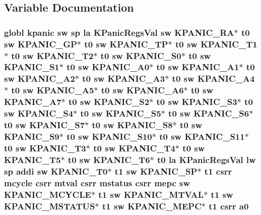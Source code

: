 \subsection{Variable Documentation}
\hypertarget{riscv_2kpanica_8S_ad4f8b71682971ae1fc71e9675e0a11df}{
\subsubsection[{a0}]{\setlength{\rightskip}{0pt plus 5cm}globl {\bf kpanic} {\bf sw} {\bf sp} {\bf la} {\bf K\-Panic\-Regs\-Val} {\bf sw} {\bf K\-P\-A\-N\-I\-C\-\_\-\-R\-A}$\ast$ {\bf t0} {\bf sw} {\bf K\-P\-A\-N\-I\-C\-\_\-\-G\-P}$\ast$ {\bf t0} {\bf sw} {\bf K\-P\-A\-N\-I\-C\-\_\-\-T\-P}$\ast$ {\bf t0} {\bf sw} {\bf K\-P\-A\-N\-I\-C\-\_\-\-T1}$\ast$ {\bf t0} {\bf sw} {\bf K\-P\-A\-N\-I\-C\-\_\-\-T2}$\ast$ {\bf t0} {\bf sw} {\bf K\-P\-A\-N\-I\-C\-\_\-\-S0}$\ast$ {\bf t0} {\bf sw} {\bf K\-P\-A\-N\-I\-C\-\_\-\-S1}$\ast$ {\bf t0} {\bf sw} {\bf K\-P\-A\-N\-I\-C\-\_\-\-A0}$\ast$ {\bf t0} {\bf sw} {\bf K\-P\-A\-N\-I\-C\-\_\-\-A1}$\ast$ {\bf t0} {\bf sw} {\bf K\-P\-A\-N\-I\-C\-\_\-\-A2}$\ast$ {\bf t0} {\bf sw} {\bf K\-P\-A\-N\-I\-C\-\_\-\-A3}$\ast$ {\bf t0} {\bf sw} {\bf K\-P\-A\-N\-I\-C\-\_\-\-A4}$\ast$ {\bf t0} {\bf sw} {\bf K\-P\-A\-N\-I\-C\-\_\-\-A5}$\ast$ {\bf t0} {\bf sw} {\bf K\-P\-A\-N\-I\-C\-\_\-\-A6}$\ast$ {\bf t0} {\bf sw} {\bf K\-P\-A\-N\-I\-C\-\_\-\-A7}$\ast$ {\bf t0} {\bf sw} {\bf K\-P\-A\-N\-I\-C\-\_\-\-S2}$\ast$ {\bf t0} {\bf sw} {\bf K\-P\-A\-N\-I\-C\-\_\-\-S3}$\ast$ {\bf t0} {\bf sw} {\bf K\-P\-A\-N\-I\-C\-\_\-\-S4}$\ast$ {\bf t0} {\bf sw} {\bf K\-P\-A\-N\-I\-C\-\_\-\-S5}$\ast$ {\bf t0} {\bf sw} {\bf K\-P\-A\-N\-I\-C\-\_\-\-S6}$\ast$ {\bf t0} {\bf sw} {\bf K\-P\-A\-N\-I\-C\-\_\-\-S7}$\ast$ {\bf t0} {\bf sw} {\bf K\-P\-A\-N\-I\-C\-\_\-\-S8}$\ast$ {\bf t0} {\bf sw} {\bf K\-P\-A\-N\-I\-C\-\_\-\-S9}$\ast$ {\bf t0} {\bf sw} {\bf K\-P\-A\-N\-I\-C\-\_\-\-S10}$\ast$ {\bf t0} {\bf sw} {\bf K\-P\-A\-N\-I\-C\-\_\-\-S11}$\ast$ {\bf t0} {\bf sw} {\bf K\-P\-A\-N\-I\-C\-\_\-\-T3}$\ast$ {\bf t0} {\bf sw} {\bf K\-P\-A\-N\-I\-C\-\_\-\-T4}$\ast$ {\bf t0} {\bf sw} {\bf K\-P\-A\-N\-I\-C\-\_\-\-T5}$\ast$ {\bf t0} {\bf sw} {\bf K\-P\-A\-N\-I\-C\-\_\-\-T6}$\ast$ {\bf t0} {\bf la} {\bf K\-Panic\-Regs\-Val} {\bf lw} {\bf sp} addi {\bf sw} {\bf K\-P\-A\-N\-I\-C\-\_\-\-T0}$\ast$ {\bf t1} {\bf sw} {\bf K\-P\-A\-N\-I\-C\-\_\-\-S\-P}$\ast$ {\bf t1} csrr mcycle csrr mtval csrr {\bf mstatus} csrr {\bf mepc} {\bf sw} {\bf K\-P\-A\-N\-I\-C\-\_\-\-M\-C\-Y\-C\-L\-E}$\ast$ {\bf t1} {\bf sw} {\bf K\-P\-A\-N\-I\-C\-\_\-\-M\-T\-V\-A\-L}$\ast$ {\bf t1} {\bf sw} {\bf K\-P\-A\-N\-I\-C\-\_\-\-M\-S\-T\-A\-T\-U\-S}$\ast$ {\bf t1} {\bf sw} {\bf K\-P\-A\-N\-I\-C\-\_\-\-M\-E\-P\-C}$\ast$ {\bf t1} csrr a0}}\label{riscv_2kpanica_8S_ad4f8b71682971ae1fc71e9675e0a11df}
